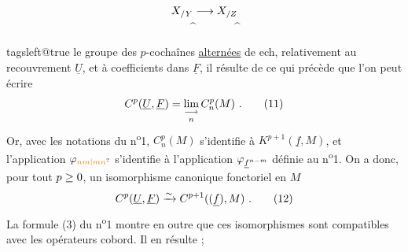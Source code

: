 \margin{$\#$}
\[
\begin{aligned}
X_{/Y}&\longrightarrow X_{/Z}\\
\widehat{\vphantom X}&\hspace{4em}\widehat{\vphantom X}
\end{aligned}
\]
\begingroup
\csname tagsleft@true\endcsname
le groupe des $p$-cochaînes \uline{alternées} de \leavevmode{}\handwritten{\v{\phantom{C}}}ech, relativement au recouvrement $\underline U$, et à  coefficients dans $\underline F$, il résulte de ce qui précède que l'on peut écrire
\[
C^p(\underline U,\underline F)=\mathop{\underset{\longrightarrow}{\lim}}\limits_n C_n^p(M)\ .\tag*{(11)}
\]
Or, avec les notations du n\textsuperscript{o}1, $C_n^p(M)$ s'identifie à $K^{p+1}(\underline f,M)$, et l'application $\handwritten{\varphi}_{\unsure{nm|mn}}$ s'identifie à l'application $\varphi_{\underline f^{n-m}}$ définie au n\textsuperscript{o}1. On a donc, pour tout $p\geq0$, un isomorphisme canonique  fonctoriel en $M$
\[
C^p(\underline U,\underline F)\handwritten{\xrightarrow{\sim}}C^{p+1}((\underline f),M)\ .\tag*{(12)}
\]
La formule (3) du n\textsuperscript{o}1 montre en outre que ces isomorphismes sont compatibles avec les opérateurs cobord. Il en résulte ;


